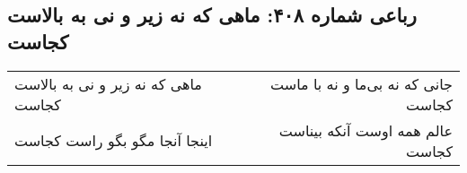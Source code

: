 \begin{center}
\section*{رباعی شماره ۴۰۸: ماهی که نه زیر و نی به بالاست کجاست}
\label{sec:0408}
\begin{longtable}{l p{0.5cm} r}
ماهی که نه زیر و نی به بالاست کجاست
&&
جانی که نه بی‌ما و نه با ماست کجاست
\\
اینجا آنجا مگو بگو راست کجاست
&&
عالم همه اوست آنکه بیناست کجاست
\\
\end{longtable}
\end{center}
